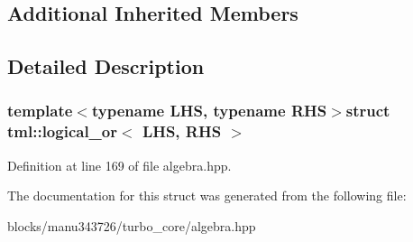 \subsection*{Additional Inherited Members}


\subsection{Detailed Description}
\subsubsection*{template$<$typename L\+H\+S, typename R\+H\+S$>$struct tml\+::logical\+\_\+or$<$ L\+H\+S, R\+H\+S $>$}



Definition at line 169 of file algebra.\+hpp.



The documentation for this struct was generated from the following file\+:\begin{DoxyCompactItemize}
\item 
blocks/manu343726/turbo\+\_\+core/algebra.\+hpp\end{DoxyCompactItemize}
